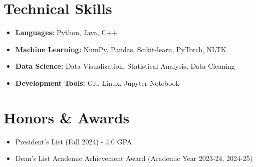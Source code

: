 \documentclass[letterpaper,11pt]{article}
\begin{document}
    \section{Technical Skills}
    \begin{itemize}
        \item \textbf{Languages:} Python, Java, C++
        \item \textbf{Machine Learning:} NumPy, Pandas, Scikit-learn, PyTorch, NLTK
        \item \textbf{Data Science:} Data Visualization, Statistical Analysis, Data Cleaning
        \item \textbf{Development Tools:} Git, Linux, Jupyter Notebook
    \end{itemize}

    \section{Honors \& Awards}
    \begin{itemize}
        \item President's List (Fall 2024) - 4.0 GPA
        \item Dean’s List Academic Achievement Award (Academic
        Year 2023-24, 2024-25)
    \end{itemize}
\end{document}
